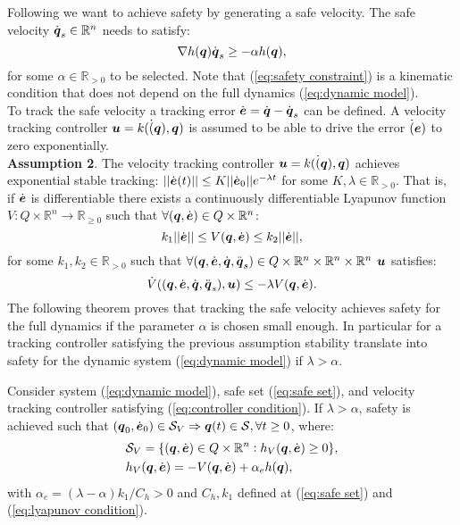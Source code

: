 Following \cite{mf_cbf} we want to achieve safety by generating a safe velocity. The safe velocity $\dot{{\boldsymbol{q}}}_s \in \mathbb{R}^n$ needs to satisfy:
\begin{equation} \label{eq:safety constraint}
    \nabla h({\boldsymbol{q}})\dot{{\boldsymbol{q}}}_s \geq -\alpha h({\boldsymbol{q}}),
\end{equation}
for some $\alpha \in \mathbb{R}_{>0}$ to be selected. Note that (\ref{eq:safety constraint}) is a kinematic condition that does not depend on the full dynamics (\ref{eq:dynamic model}).\\
To track the safe velocity a tracking error $\dot{\boldsymbol{e}} = \dot{{\boldsymbol{q}}}-\dot{{\boldsymbol{q}}}_s$ can be defined. A velocity tracking controller $\boldsymbol{u} = k(\dot({\boldsymbol{q}}),{\boldsymbol{q}})$ is assumed to be able to drive the error $\dot(\boldsymbol{e})$ to zero exponentially.\\
\textbf{Assumption 2}. The velocity tracking controller $\boldsymbol{u} = k(\dot({\boldsymbol{q}}),{\boldsymbol{q}})$ achieves exponential stable tracking: $||\dot{\boldsymbol{e}}(t)||\leq K ||\dot{\boldsymbol{e}}_0|| e^{-\lambda t}$ for some $K,\lambda \in \mathbb{R}_{>0}$. That is, if $\dot{\boldsymbol{e}}$ is differentiable there exists a continuously differentiable Lyapunov function $V: Q \times \mathbb{R}^n \rightarrow \mathbb{R}_{\geq 0}$ such that $\forall({\boldsymbol{q}},\dot{\boldsymbol{e}})\in Q \times \mathbb{R}^n$:
\begin{equation} \label{eq:lyapunov condition}
    k_1 || \dot{\boldsymbol{e}}|| \leq V({\boldsymbol{q}}, \dot{\boldsymbol{e}}) \leq k_2 || \dot{\boldsymbol{e}}||,
\end{equation}
for some $k_1,k_2\in \mathbb{R}_{>0}$ such that $\forall({\boldsymbol{q}},\dot{\boldsymbol{e}},\dot{{\boldsymbol{q}}},\ddot{{\boldsymbol{q}}}_s)\in Q \times \mathbb{R}^n \times \mathbb{R}^n \times \mathbb{R}^n$ $\boldsymbol{u}$ satisfies:
\begin{equation} \label{eq:controller condition}
    \dot{V}(({\boldsymbol{q}},\dot{\boldsymbol{e}},\dot{{\boldsymbol{q}}},\ddot{{\boldsymbol{q}}}_s),\boldsymbol{u}) \leq -\lambda V({\boldsymbol{q}},\dot{\boldsymbol{e}}).
\end{equation}
The following theorem proves that tracking the safe velocity achieves safety for the full dynamics if the parameter $\alpha$ is chosen small enough. In particular for a tracking controller satisfying the previous assumption stability translate into safety for the dynamic system (\ref{eq:dynamic model}) if $\lambda > \alpha$. 
\begin{theorem}\label{th:alpha limit}
    Consider system (\ref{eq:dynamic model}), safe set (\ref{eq:safe set}), and velocity tracking controller satisfying (\ref{eq:controller condition}). If $\lambda > \alpha$, safety is achieved such that $({\boldsymbol{q}}_0,\dot{\boldsymbol{e}}_0)\in \mathcal{S}_V \Rightarrow {\boldsymbol{q}}(t) \in \mathcal{S}, \forall t\geq 0$, where:
    \begin{align}
        &\mathcal{S}_V = \{ ({\boldsymbol{q}},\dot{\boldsymbol{e}})\in Q \times \mathbb{R}^n: h_V({\boldsymbol{q}},\dot{\boldsymbol{e}})\geq 0 \},\\
        &h_V({\boldsymbol{q}},\dot{\boldsymbol{e}}) = -V({\boldsymbol{q}},\dot{\boldsymbol{e}})+ \alpha_e h({\boldsymbol{q}}),
    \end{align}
    with $\alpha_e = (\lambda - \alpha)k_1/C_h > 0$ and $C_h,k_1$ defined at (\ref{eq:safe set}) and (\ref{eq:lyapunov condition}).
\end{theorem}
